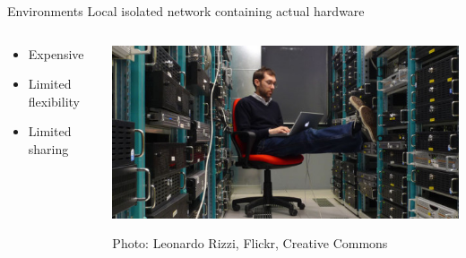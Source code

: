 \documentclass{beamer}
\begin{document}
	\begin{frame}{Environments}
		Local isolated network containing actual hardware
		\vfill
		\begin{columns}
 		\begin{column}{0.5\textwidth}
    			\begin{itemize}
        				\item Expensive
        				\item Limited flexibility
        				\item Limited sharing
    			\end{itemize}
  		\end{column}

		\begin{column}{0.5\textwidth}
     			\includegraphics[width=\textwidth]{env-datacenter_rizzi.jpg}
			
			{\tiny Photo: Leonardo Rizzi, Flickr, Creative Commons}
  		\end{column}
		\end{columns}
	\end{frame}
	
\end{document}
